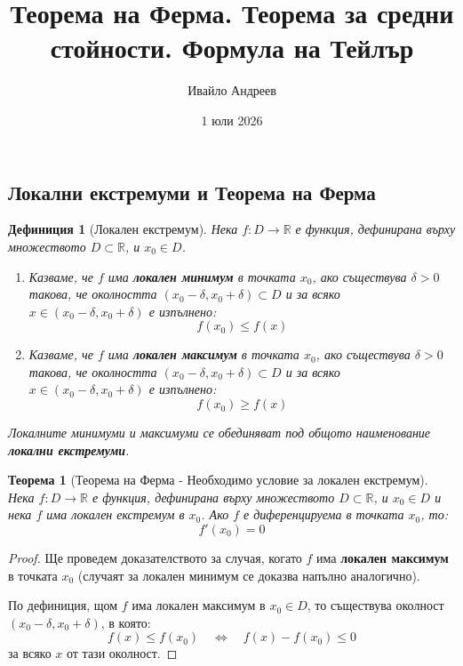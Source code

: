 \documentclass{scrartcl}
\title{Теорема на Ферма. Теорема за средни стойности. Формула на Тейлър}
\author{Ивайло Андреев}
\date{1 юли 2026}
\newtheorem{theorem}{Теорема}
\newtheorem{definition}{Дефиниция}
\begin{document}
\maketitle

\tableofcontents

\newpage

\begin{FlushLeft}

\section{Локални екстремуми и Теорема на Ферма}

\begin{definition}[Локален екстремум]
Нека $f: D \to \mathbb{R}$ е функция, дефинирана върху множеството $D \subset \mathbb{R}$, и $x_0 \in D$.
\begin{enumerate}
    \item Казваме, че $f$ има \textbf{локален минимум} в точката $x_0$, ако съществува $\delta > 0$ такова, че околността $(x_0 - \delta, x_0 + \delta) \subset D$ и за всяко $x \in (x_0 - \delta, x_0 + \delta)$ е изпълнено:
    \[ f(x_0) \le f(x) \]
    \item Казваме, че $f$ има \textbf{локален максимум} в точката $x_0$, ако съществува $\delta > 0$ такова, че околността $(x_0 - \delta, x_0 + \delta) \subset D$ и за всяко $x \in (x_0 - \delta, x_0 + \delta)$ е изпълнено:
    \[ f(x_0) \ge f(x) \]
\end{enumerate}
Локалните минимуми и максимуми се обединяват под общото наименование \textbf{локални екстремуми}.
\end{definition}

\begin{theorem}[Теорема на Ферма - Необходимо условие за локален екстремум]
Нека $f: D \to \mathbb{R}$ е функция, дефинирана върху множеството $D \subset \mathbb{R}$, и $x_0 \in D$ и нека $f$ има локален екстремум в $x_0$. Ако $f$ е диференцируема в точката $x_0$, то:
\[ f'(x_0) = 0 \]
\end{theorem}

\begin{proof}
Ще проведем доказателството за случая, когато $f$ има \textbf{локален максимум} в точката $x_0$ (случаят за локален минимум се доказва напълно аналогично).

По дефиниция, щом $f$ има локален максимум в $x_0 \in D$, то съществува околност $(x_0 - \delta, x_0 + \delta)$, в която:
\[ f(x) \le f(x_0) \quad \iff \quad f(x) - f(x_0) \le 0 \]
за всяко $x$ от тази околност.


\end{proof}
\end{FlushLeft}
\end{document}
